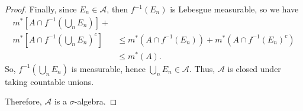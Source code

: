 \documentclass{article}
\begin{document}
\begin{proof}
	Finally, since $E_n \in \mathcal{A}$, then $f^{-1}(E_n)$ is Lebesgue measurable, so we have 
	\begin{align}
		m^*\left[A\cap f^{-1}\left(\bigcup_n E_n\right)\right] + \\ m^*\left[A\cap f^{-1}\left(\bigcup_n E_n\right)^c\right]
		&\leq m^*\left(A\cap f^{-1}(E_n)\right) + m^*(A\cap f^{-1}(E_n)^c) \\
		&\leq m^*(A).
	\end{align}
	So, $f^{-1}\left(\bigcup_n E_n\right)$ is measurable, hence $\bigcup_n E_n \in \mathcal{A}$. Thus, $\mathcal{A}$ is closed under taking countable unions.
	
	Therefore, $\mathcal{A}$ is a $\sigma$-algebra.
\end{proof}
\end{document}

